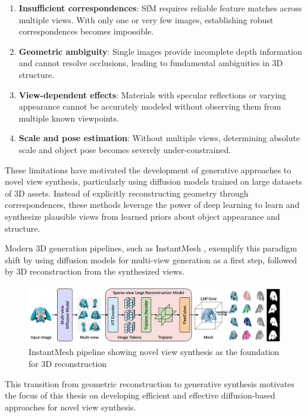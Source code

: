 \begin{enumerate}
  \item \textbf{Insufficient correspondences}: SfM requires reliable feature matches across multiple views. With only one or very few images, establishing robust correspondences becomes impossible.

  \item \textbf{Geometric ambiguity}: Single images provide incomplete depth information and cannot resolve occlusions, leading to fundamental ambiguities in 3D structure.

  \item \textbf{View-dependent effects}: Materials with specular reflections or varying appearance cannot be accurately modeled without observing them from multiple known viewpoints.

  \item \textbf{Scale and pose estimation}: Without multiple views, determining absolute scale and object pose becomes severely under-constrained.
\end{enumerate}

These limitations have motivated the development of generative approaches to novel view synthesis, particularly using diffusion models trained on large datasets of 3D assets. Instead of explicitly reconstructing geometry through correspondences, these methods leverage the power of deep learning to learn and synthesize plausible views from learned priors about object appearance and structure.

Modern 3D generation pipelines, such as InstantMesh \cite{instantmesh}, exemplify this paradigm shift by using diffusion models for multi-view generation as a first step, followed by 3D reconstruction from the synthesized views.

\begin{figure}[h]
  \centering
  \includegraphics[width=\textwidth]{images/related-work/instantmesh.png}
  \caption{InstantMesh pipeline showing novel view synthesis as the foundation for 3D reconstruction}
  \label{fig:instantmesh}
\end{figure}

This transition from geometric reconstruction to generative synthesis motivates the focus of this thesis on developing efficient and effective diffusion-based approaches for novel view synthesis.


